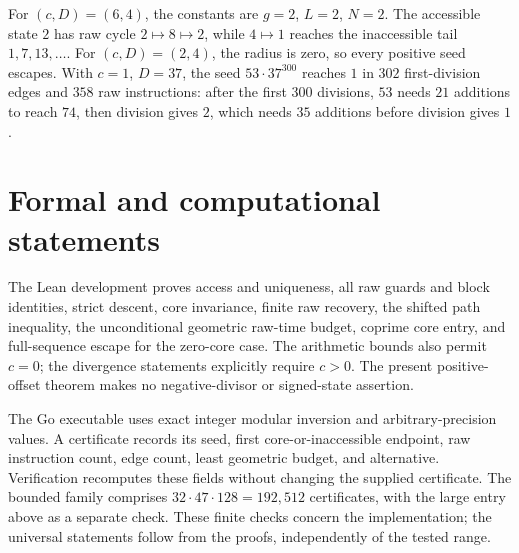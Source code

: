 \documentclass[11pt,letterpaper]{article}
\begin{document}
For \((c,D)=(6,4)\), the constants are \(g=2\), \(L=2\), \(N=2\).
The accessible state \(2\) has raw cycle \(2\mapsto8\mapsto2\), while
\(4\mapsto1\) reaches the inaccessible tail \(1,7,13,\ldots\).
For \((c,D)=(2,4)\), the radius is zero, so every positive seed escapes.
With \(c=1\), \(D=37\), the seed \(53\cdot37^{300}\) reaches \(1\)
in \(302\) first-division edges and \(358\) raw instructions: after the
first \(300\) divisions, \(53\) needs \(21\) additions to reach \(74\),
then division gives \(2\), which needs \(35\) additions before division
gives \(1\).

\section{Formal and computational statements}

The Lean development proves access and uniqueness, all raw guards and block
identities, strict descent, core invariance, finite raw recovery, the shifted
path inequality, the unconditional geometric raw-time budget, coprime core
entry, and full-sequence escape for the zero-core case.
The arithmetic bounds also permit \(c=0\); the divergence statements
explicitly require \(c>0\). The present positive-offset theorem makes no
negative-divisor or signed-state assertion.

The Go executable uses exact integer modular inversion and arbitrary-precision
values. A certificate records its seed, first core-or-inaccessible endpoint,
raw instruction count, edge count, least geometric budget, and alternative.
Verification recomputes these fields without changing the supplied
certificate. The bounded family comprises \(32\cdot47\cdot128=192{,}512\)
certificates, with the large entry above as a separate check. These finite
checks concern the implementation; the universal statements follow from the
proofs, independently of the tested range.
\end{document}

